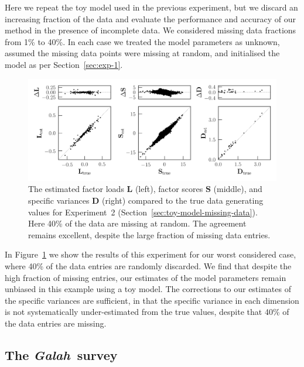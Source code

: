 \documentclass[twocolumn]{aastex62}
\newcommand{\project}[1]{\textsl{#1}}
\newcommand{\Galah}{\project{Galah}}
\newcommand{\vect}[1]{\boldsymbol{\mathbf{#1}}}
\renewcommand{\vec}[1]{\vect{#1}}
\newcommand{\factorloads}{\textbf{L}}
\newcommand{\factorscores}{\textbf{S}}
\newcommand{\specificvariance}{\vec{D}}
\begin{document}
Here we repeat the toy model used in the previous experiment, but we discard an increasing fraction
of the data and evaluate the performance and accuracy of our method in the presence
of incomplete data. We considered missing data fractions from 1\% to
40\%. In each case we treated the model parameters as unknown, assumed
the missing data points were missing at random, and initialised the
model as per Section~\ref{sec:exp-1}.

\begin{figure}[t!]
	\includegraphics[width=\textwidth]{experiments/exp-missing-data-not-at-random-inflated-40percent.png}
    \caption{The estimated factor loads $\factorloads$ (left), factor scores $\factorscores$ (middle),
    		 and specific variances $\specificvariance$ (right) compared to the 
		 	 true data generating values
		 	 for Experiment~2 (Section~\ref{sec:toy-model-missing-data}). Here 40\% of the data are missing at random.
			 The agreement remains excellent,
			 despite the large fraction of missing data entries.}
    \label{fig:exp1-missing-data}
\end{figure}


In Figure~\ref{fig:exp1-missing-data} we show the results of this
experiment for our worst considered case, where 40\% of the data
entries are randomly discarded. We find that despite the high fraction
of missing entries, our estimates of the model parameters remain unbiased
in this example using a toy model. The corrections to our estimates of the
specific variances are sufficient, in that the specific variance in each
dimension is not systematically under-estimated from the true values, 
despite that 40\% of the data entries are missing.


\vspace{2em}

\subsection{The \Galah\ survey}
\label{sec:exp4}
\end{document}
